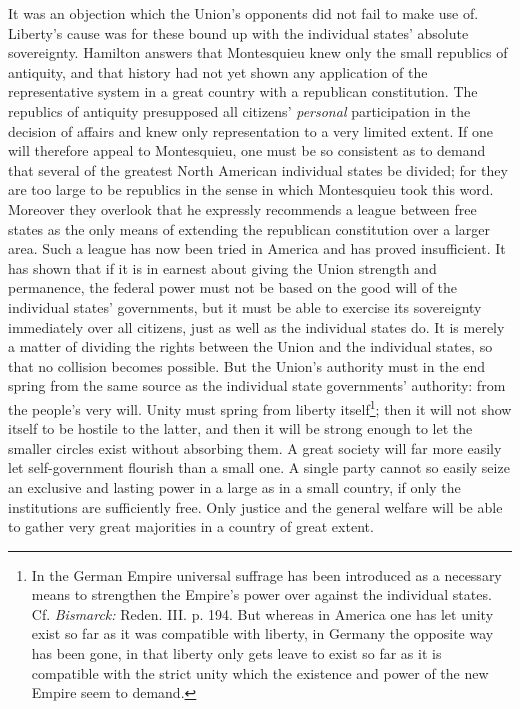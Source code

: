 \documentclass[12pt,a4paper,openany]{book}
\newcommand{\opage}[1]{\marginnote{\footnotesize\textit{[#1]}}}
\begin{document}
It was an objection which the Union's opponents
did not fail to make use of. Liberty's cause was for these bound up
with the individual states' absolute sovereignty. Hamilton answers
that Montesquieu knew only the small republics of antiquity, and
that history had not yet shown any application of the
representative system in a great country with a republican
constitution. The republics of antiquity presupposed all citizens'
\emph{personal} participation in the decision of affairs and knew only
representation to a very limited extent. If one will therefore
appeal to Montesquieu, one must be so
consistent as to demand that several of the greatest North American
individual states be divided; for they are too large to be republics in the
sense in which Montesquieu took this word. Moreover they overlook
that he expressly recommends a league between free
states as the only means of extending the republican
constitution over a larger area. Such a league
has now been tried in America and has proved insufficient. It has
shown that if it is in earnest about giving the Union strength
\opage{134}and permanence, the federal power must not be based on the good
will of the individual states' governments, but it must be able to
exercise its sovereignty immediately over all citizens, just
as well as the individual states do. It is merely a matter of
dividing the rights between the Union and the individual states, so
that no collision becomes possible. But the Union's
authority must in the end spring from the same source as the
individual state governments' authority: from the people's very will. Unity
must spring from liberty itself\footnote{In the German Empire universal suffrage has been introduced as a necessary
means to strengthen the Empire's power over against the individual states. Cf.
\emph{Bismarck:} Reden. III. p. 194. But whereas in America one has
let unity exist so far as it was compatible with liberty,
in Germany the opposite way has been gone, in that liberty only
gets leave to exist so far as it is compatible with the
strict unity which the existence and power of the new Empire seem to demand.}; then it will not show itself
to be hostile to the latter, and then it will be strong enough
to let the smaller circles exist without absorbing
them. A great society will far more easily let self-government
flourish than a small one. A single party cannot so easily
seize an exclusive and lasting power in a large as in a
small country, if only the institutions are sufficiently free.
Only justice and the general welfare will be able to gather
very great majorities in a country of great extent.
\end{document}

